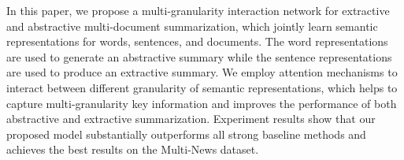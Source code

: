 In this paper, we propose a multi-granularity interaction network for extractive and abstractive multi-document summarization, which jointly learn semantic representations for words, sentences, and documents. The word representations are used to generate an abstractive summary while the sentence representations are used to produce an extractive summary. We employ attention mechanisms to interact between different granularity of semantic representations, which helps to capture multi-granularity key information and improves the performance of both abstractive and extractive summarization. Experiment results show that our proposed model substantially outperforms all strong baseline methods and achieves the best results on the Multi-News dataset.
